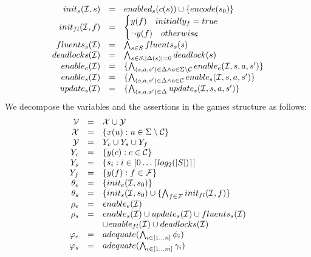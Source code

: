 \begin{definition}
\[\begin{array}{r c l}
init_s(\mathcal{I},s) &=& enabled_s(c(s)) \cup \{ encode(s_0) \}\\
init_{fl}(\mathcal{I}, f) &=& 
\begin{cases}
y(f)  \quad initially_f = true\\
\neg y(f)  \quad otherwise\\
\end{cases}\\
fluents_s(\mathcal{I}) &=& \bigwedge_{s \in S} fluents_s(s)\\
deadlocks(\mathcal{I}) &=& \bigwedge_{s \in S, |\Delta(s)| = 0} deadlock(s)\\
enable_e(\mathcal{I}) &=& \{ \bigwedge_{(s, a, s') \in \Delta \wedge a \in \Sigma \setminus \mathcal{C}} enable_e(\mathcal{I}, s, a, s') \}\\
enable_s(\mathcal{I}) &=& \{ \bigwedge_{(s, a, s') \in \Delta \wedge a \in \mathcal{C}} enable_s(\mathcal{I}, s, a, s') \}\\
update_s(\mathcal{I}) &=& \{ \bigwedge_{(s, a, s') \in \Delta} update_s(\mathcal{I}, s, a, s') \}\\
\end{array}
\]
We decompose the variables and the assertions in the games structure as follows:
\[
\begin{array}{r c l}
\mathcal{V} &=& \mathcal{X} \cup \mathcal{Y}\\
\mathcal{X} &=& \{ x(u) : u \in \Sigma \setminus \mathcal{C} \}\\
\mathcal{Y} &=& Y_c \cup Y_s \cup Y_f \\
Y_c &=& \{y(c) : c \in \mathcal{C}\} \\
Y_s &=& \{s_i : i \in [0\ldots \lceil log_2(|S|) \rceil ] \\
Y_f &=& \{ y(f) : f \in \mathcal{F} \}\\
\theta_e &=& \{ init_e(\mathcal{I}, s_0) \}\\
\theta_s &=& \{ init_s(\mathcal{I}, s_0) \cup \{ \bigwedge_{f \in \mathcal{F}} init_{fl}(\mathcal{I}, f)  \}\\
\rho_e &=& enable_e(\mathcal{I})\\
\rho_s &=& enable_s(\mathcal{I}) \cup update_s(\mathcal{I}) 
\cup fluents_s(\mathcal{I}) \\
&& \cup enable_{fl}(\mathcal{I}) \cup deadlocks(\mathcal{I})\\
\varphi_e &=& adequate(\bigwedge_{i \in [1 \ldots n]} \phi_i)\\
\varphi_s &=& adequate(\bigwedge_{i \in [1 \ldots m]} \gamma_i)\\
\end{array}
\]

\end{definition}
